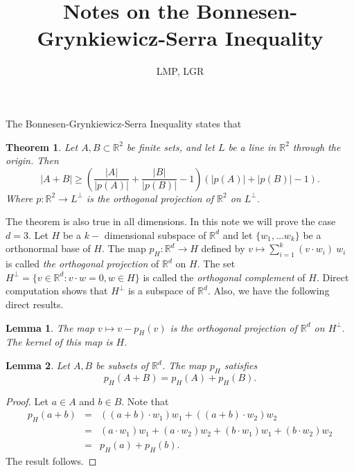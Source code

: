 \documentclass[12pt]{article}
\title{Notes on the Bonnesen-Grynkiewicz-Serra Inequality}
\author{LMP, LGR}
\newcommand{\R}{\mathbb{R}}
\newtheorem{theorem}{Theorem}
\newtheorem{lemma}{Lemma}
\begin{document}
\maketitle

The Bonnesen-Grynkiewicz-Serra Inequality states that %
\begin{theorem} \label{GS}
Let $A, B \subset \R^2$ be finite sets, and let $L$ be a line in $\R^2$ through the origin. Then
$$\lvert A + B \rvert \geq \left( \frac{\lvert A \rvert }{\lvert p (A) \rvert} + \frac{\lvert B \rvert }{\lvert p (B) \rvert } - 1\right) \left( \lvert p(A) \rvert + \lvert p(B) \rvert - 1 \right).$$
Where $p: \R^2 \rightarrow L^\perp$ is the orthogonal projection of $\R^2$ on $L^\perp$.
\end{theorem}

The theorem is also true in all dimensions. In this note we will prove the case $d = 3.$ Let $H$ be a $k-$ dimensional subspace of $\R^d$ and let $\{w_1, \ldots w_k\}$ be a orthonormal base of $H.$ The map $p_H: \R^d \rightarrow H$ defined by $v \mapsto \sum_{i=1}^k (v \cdot w_i) \ w_i$ is called \textit{the orthogonal projection} of $\R^d$ on $H.$ The set $H^\perp = \{v \in \R^d: v \cdot w = 0, w \in H \}$ is called the \textit{orthogonal complement} of $H$. Direct computation shows that $H^\perp$ is a subspace of $\R^d$. Also, we have the following direct results. %

\begin{lemma}
    The map $v \mapsto v - p_H (v)$ is the orthogonal projection of $\R^d$ on $H^\perp.$ The kernel of this map is $H$.
\end{lemma}

\begin{lemma}
    Let $A, B$ be subsets of $\R^d$. The map $p_H$ satisfies 
    $$p_H(A + B) = p_H(A) + p_H(B).$$
\end{lemma}
\begin{proof} Let $a \in A$ and $b\in B.$ Note that 
\begin{eqnarray*}
p_H(a + b) &=&  ((a + b)\cdot w_1) w_1 + ((a+b) \cdot w_2) w_2\\
&=& (a\cdot w_1) w_1 + (a \cdot w_2) w_2 +(b\cdot w_1) w_1 + (b \cdot w_2) w_2\\
&=& p_H(a) + p_H(b).
\end{eqnarray*}
The result follows.
\end{proof}
\end{document}
